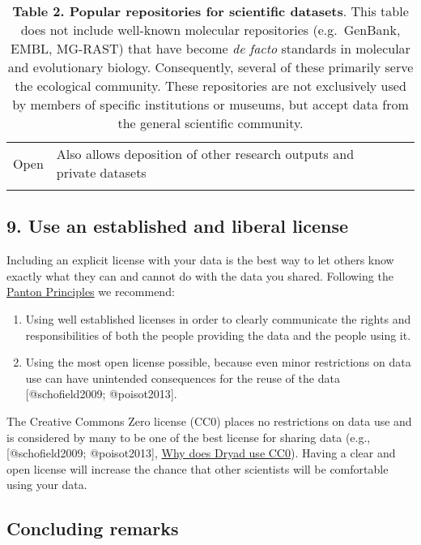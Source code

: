 \begin{longtable}[c]{@{}llllll@{}}
\begin{minipage}[t]{0.10\columnwidth}
Open
\end{minipage} & \begin{minipage}[t]{0.15\columnwidth}\raggedright
Also allows deposition of other research outputs and private datasets
\end{minipage}
\\\addlinespace
\bottomrule
\addlinespace
\caption{\textbf{Table 2. Popular repositories for scientific datasets}.
This table does not include well-known molecular repositories
(e.g.~GenBank, EMBL, MG-RAST) that have become \emph{de facto} standards
in molecular and evolutionary biology. Consequently, several of these
primarily serve the ecological community. These repositories are not
exclusively used by members of specific institutions or museums, but
accept data from the general scientific community.}
\end{longtable}

\subsection{9. Use an established and liberal
license}\label{use-an-established-and-liberal-license}

Including an explicit license with your data is the best way to let
others know exactly what they can and cannot do with the data you
shared. Following the \href{http://pantonprinciples.org}{Panton
Principles} we recommend:

\begin{enumerate}
\def\labelenumi{\arabic{enumi}.}
\itemsep1pt\parskip0pt
\item
  Using well established licenses in order to clearly communicate the
  rights and responsibilities of both the people providing the data and
  the people using it.
\item
  Using the most open license possible, because even minor restrictions
  on data use can have unintended consequences for the reuse of the data
  {[}@schofield2009; @poisot2013{]}.
\end{enumerate}

The Creative Commons Zero license (CC0) places no restrictions on data
use and is considered by many to be one of the best license for sharing
data (e.g., {[}@schofield2009; @poisot2013{]},
\href{http://blog.datadryad.org/2011/10/05/why-does-dryad-use-cc0/}{Why
does Dryad use CC0}). Having a clear and open license will increase the
chance that other scientists will be comfortable using your data.

\subsection{Concluding remarks}\label{concluding-remarks}

